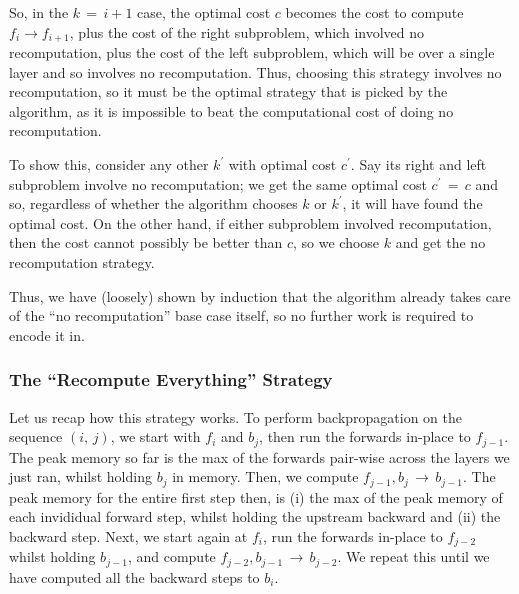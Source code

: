 So, in the \(k\,=\,i+1\) case, the optimal cost \(c\) becomes the cost to compute \(f_i\rightarrow f_{i+1}\), plus the cost of the right subproblem, which involved no recomputation, plus the cost of the left subproblem, which will be over a single layer and so involves no recomputation.
Thus, choosing this strategy involves no recomputation, so it must be the optimal strategy that is picked by the algorithm, as it is impossible to beat the computational cost of doing no recomputation.

To show this, consider any other \(k^\prime\) with optimal cost \(c^\prime\).
Say its right and left subproblem involve no recomputation;
we get the same optimal cost \(c^\prime\,=\,c\) and so, regardless of whether the algorithm chooses \(k\) or \(k^\prime\), it will have found the optimal cost.
On the other hand, if either subproblem involved recomputation, then the cost cannot possibly be better than \(c\), so we choose \(k\) and get the no recomputation strategy.

Thus, we have (loosely) shown by induction that the algorithm already takes care of the ``no recomputation'' base case itself, so no further work is required to encode it in.

\subsubsection{The ``Recompute Everything'' Strategy}
Let us recap how this strategy works.
To perform backpropagation on the sequence \((i,\,j)\), we start with \(f_i\) and \(b_j\), then run the forwards in-place to \(f_{j-1}\).
The peak memory so far is the max of the forwards pair-wise across the layers we just ran, whilst holding \(b_j\) in memory.
Then, we compute \(f_{j-1}, b_j \,\rightarrow\, b_{j-1}\).
The peak memory for the entire first step then, is (i) the max of the peak memory of each invididual forward step, whilst holding the upstream backward and (ii) the backward step.
Next, we start again at \(f_i\), run the forwards in-place to \(f_{j-2}\) whilst holding \(b_{j-1}\), and compute \(f_{j-2}, b_{j-1} \,\rightarrow\, b_{j-2}\).
We repeat this until we have computed all the backward steps to \(b_i\).

